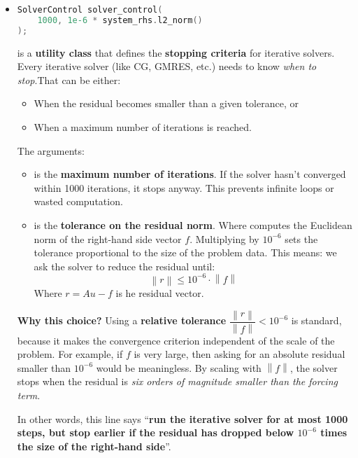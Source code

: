 \begin{itemize}
    \item {}
    \begin{lstlisting}[language=C++]
SolverControl solver_control(
    1000, 1e-6 * system_rhs.l2_norm()
);\end{lstlisting}
     is a  \textbf{utility class} that defines the \textbf{stopping criteria} for iterative solvers. Every iterative solver (like CG, GMRES, etc.) needs to know \emph{when to stop}.That can be either:
    \begin{itemize}
        \item When the residual becomes smaller than a given tolerance, or
        \item When a maximum number of iterations is reached.
    \end{itemize}
    The arguments:
    \begin{itemize}
        \item {} is the \textbf{maximum number of iterations}. If the solver hasn't converged within 1000 iterations, it stops anyway. This prevents infinite loops or wasted computation.
        \item {} is the \textbf{tolerance on the residual norm}. Where  computes the Euclidean norm of the right-hand side vector $f$. Multiplying by $10^{-6}$ sets the tolerance proportional to the size of the problem data. This means: we ask the solver to reduce the residual until:
        \begin{equation*}
            \left\| r \right\| \leq 10^{-6} \cdot \left\| f \right\|
        \end{equation*}
        Where $r = A u - f$ is he residual vector.
    \end{itemize}

    \textcolor{Green3}{ \textbf{Why this choice?}} Using a \textbf{relative tolerance} $\dfrac{\left\| r \right\|}{\left\| f \right\|} < 10^{-6}$ is standard, because it makes the convergence criterion independent of the scale of the problem. For example, if $f$ is very large, then asking for an absolute residual smaller than $10^{-6}$ would be meaningless. By scaling with $\left\|f\right\|$, the solver stops when the residual is \emph{six orders of magnitude smaller than the forcing term}.

    In other words, this line says ``\textbf{run the iterative solver for at most 1000 steps, but stop earlier if the residual has dropped below $10^{-6}$ times the size of the right-hand side}''.



\end{itemize}
